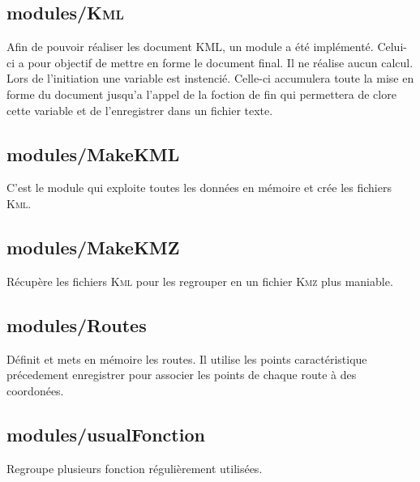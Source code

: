     \subsection{modules/\textsc{Kml}\label{pyKML}}
Afin de pouvoir réaliser les document KML, un module a été implémenté. Celui-ci a pour objectif de mettre en forme le document final. Il ne réalise aucun calcul. Lors de l'initiation une variable est instencié. Celle-ci accumulera toute la mise en forme du document jusqu'a l'appel de la foction de fin qui permettera de clore cette variable et de l'enregistrer dans un fichier texte.
\newpage


    \subsection{modules/MakeKML\label{pyMakeKML}} 
C'est le module qui exploite toutes les données en mémoire et crée les fichiers \textsc{Kml}.
\newpage
 
    \subsection{modules/MakeKMZ\label{pyMakeKMZ}} 
Récupère les fichiers \textsc{Kml} pour les regrouper en un fichier \textsc{Kmz} plus maniable. 
\newpage

    \subsection{modules/Routes\label{pyRoutes}} 
Définit et mets en mémoire les routes. Il utilise les points caractéristique précedement enregistrer pour associer les points de chaque route à des coordonées.
\newpage

    \subsection{modules/usualFonction\label{pyusualFonction}} 
Regroupe plusieurs fonction régulièrement utilisées. 
\newpage






